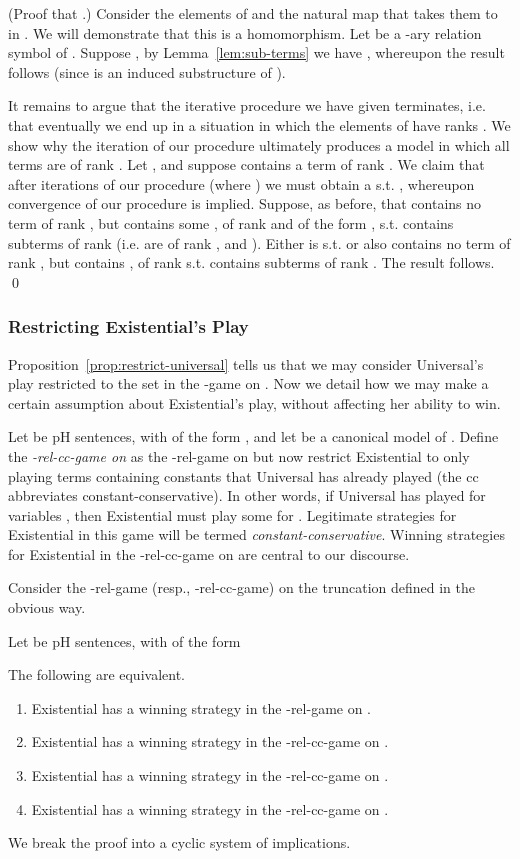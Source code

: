 \documentclass{LMCS}
\begin{document}
(Proof that .) 
Consider the elements  of  and the natural map that takes them to  in . We will demonstrate that this is a homomorphism. Let  be a -ary relation symbol of . 
Suppose , by Lemma~\ref{lem:sub-terms} we have  , whereupon the result follows (since  is an induced substructure of ).

It remains to argue that the iterative procedure we have given terminates, \mbox{i.e.} that eventually we end up in a situation in which the elements of  have ranks . We show why the iteration of our procedure ultimately produces a model in which all terms are of rank .
Let , and suppose  contains a term  of rank .
We claim that after  iterations of our procedure (where ) we must obtain a  s.t. , whereupon convergence of our procedure is implied.
Suppose, as before, that  contains no term of rank , but contains some , of rank  and of the form , s.t.  contains  subterms of rank  (i.e.  are of rank , and ). Either  is s.t.  or  also contains no term of rank , but contains , of rank  s.t.  contains  subterms of rank . The result follows.
\qed

\subsubsection{Restricting Existential's Play}

Proposition~\ref{prop:restrict-universal} tells us that we may consider Universal's play restricted to the set  in the -game on . Now we detail how we may make a certain assumption about Existential's play, without affecting her ability to win.

Let  be pH sentences, with  of the form , and let  be a canonical model of . Define the \emph{-rel-cc-game on } as the -rel-game on  but now restrict Existential to only playing terms  containing constants that Universal has already played (the cc abbreviates constant-conservative). In other words, if Universal has played  for variables , then Existential must play some  for . Legitimate strategies for Existential in this game will be termed \emph{constant-conservative}. Winning strategies for Existential in the -rel-cc-game on  are central to our discourse.

Consider the -rel-game (resp., -rel-cc-game) on the truncation  defined in the obvious way.
\begin{prop}
\label{prop:cc}
Let  be pH sentences, with  of the form 

 The following are equivalent.
  \begin{enumerate}[label=(\roman*)]
\item  Existential has a winning strategy in the -rel-game on .
\item  Existential has a winning strategy in the -rel-cc-game on .
\item Existential has a winning strategy in the -rel-cc-game on .
\item Existential has a winning strategy in the -rel-cc-game on .
\end{enumerate}
\end{prop}
\proof We break the proof into a cyclic system of implications.
\end{document}
